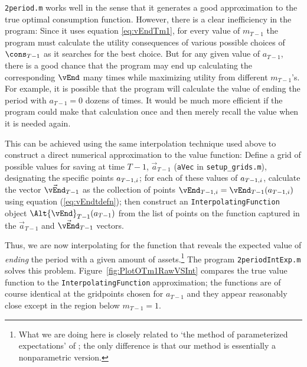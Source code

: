 \documentclass[titlepage]{\econtex}
\begin{document}
\texttt{2period.m} works well in the sense that it
generates a good approximation to the true optimal consumption
function.  However, there is a clear inefficiency in the program:
Since it uses equation \eqref{eq:vEndTm1}, for every value
of ${m}_{T-1}$ the program must calculate the utility consequences of
various possible choices of $\cons_{T-1}$ as it searches for the best choice.
 But for any given value of ${a}_{T-1}$,
there is a good chance that the program may end up calculating the
corresponding $\vEnd$ many times while maximizing utility from different
${m}_{T-1}$'s.  For example, it is possible that the program will
calculate the value of ending the period with ${a}_{T-1}=0$ dozens of times.  It would
be much more efficient if the program could make that calculation once
and then merely recall the value when it is needed again.

This can be achieved using the same interpolation technique used above
to construct a direct numerical approximation to the value function:
Define a grid of possible values for saving at time $T-1$,
$\vec{a}_{T-1}$
(\texttt{aVec}
in \texttt{setup\_grids.m}), designating the
specific points $\null{a}_{T-1,i}$; for each of these values of
$\null{a}_{T-1,i}$, calculate the vector $\vec{\vEnd}_{T-1}$ as the collection of points $\vEnd_{T-1,i} =
\vEnd_{T-1}(\null{a}_{T-1,i})$ using equation
(\ref{eq:vEndtdefn}); then construct an
\texttt{InterpolatingFunction} object
$\Alt{\vEnd}_{T-1}({a}_{T-1})$ from the list of 
points on the function captured in the $\vec{a}_{T-1}$ and $\vec{\vEnd}_{T-1}$ vectors.

Thus, we are now interpolating for the function 
that reveals the expected value of \textit{ending} the period with a given amount
of assets.\footnote{What we are doing here is closely related to `the
  method of parameterized expectations' of
  \cite{denHaanMarcet:parameterized}; the only difference is that our
  method is essentially a nonparametric version.}  The
program \texttt{2periodIntExp.m} solves this problem.  Figure~\ref{fig:PlotOTm1RawVSInt} compares the true value function to the
\texttt{InterpolatingFunction} approximation; the functions are of course
identical at the gridpoints chosen for ${a}_{T-1}$ and they appear
reasonably close except in the region below
${m}_{T-1}=1$.
\end{document}
